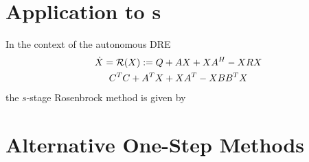 
\section{Application to s}

In the context of the autonomous \ac{DRE}
\begin{gather*}
  \dot X = \operatorname{\mathcal R}(X) :=
  Q + AX + XA^H - XRX
  \\
  C^T C + A^T X + XA^T - X BB^T X
\end{gather*}
the $s$-stage Rosenbrock method is given by

\section{Alternative One-Step Methods}
